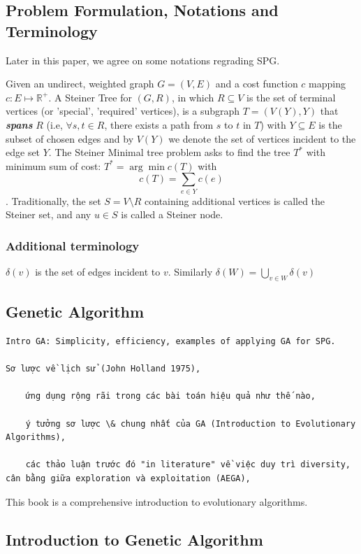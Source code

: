 \documentclass[runningheads]{llncs}
\begin{document}
\subsection*{Problem Formulation, Notations and Terminology}
Later in this paper, we agree on some notations regrading SPG.

Given an undirect, weighted graph $G = (V,E)$ and a cost function $c$ mapping $c : E \mapsto \mathbb{R}^+$. A Steiner Tree for $(G,R)$, in which $R \subseteq V$ is the set of terminal vertices (or 'special', 'required' vertices), is a subgraph $T = (V(Y), Y)$ that \textbf{\textit{spans}} $R$ (i.e, $\forall s,t \in R$, there exists a path from $s$ to $t$ in $T$) with $Y \subseteq E$ is the subset of chosen edges and by $V(Y)$ we denote the set of vertices incident to the edge set $Y$.
The Steiner Minimal tree problem asks to find the tree $T^*$ with minimum sum of cost: $T^* = \arg\min c(T)$ with $$c(T) = \sum_{e \in Y} c(e)$$.
Traditionally, the set $S = V \setminus R$ containing additional vertices is called the Steiner set, and any $u \in S$ is called a Steiner node.

\subsubsection*{Additional terminology}
$\delta(v)$ is the set of edges incident to $v$. Similarly $\delta(W) = \bigcup_{v \in W} \delta(v)$ 

\subsection{Genetic Algorithm}
\begin{verbatim}
Intro GA: Simplicity, efficiency, examples of applying GA for SPG.
    
Sơ lược về lịch sử (John Holland 1975), 
    
    ứng dụng rộng rãi trong các bài toán hiệu quả như thế nào,

    ý tưởng sơ lược \& chung nhất của GA (Introduction to Evolutionary Algorithms),

    các thảo luận trước đó "in literature" về việc duy trì diversity, cân bằng giữa exploration và exploitation (AEGA),      
\end{verbatim}


This book \cite{yu2010introduction} is a comprehensive introduction to evolutionary algorithms.

\subsection*{Introduction to Genetic Algorithm}
\end{document}
